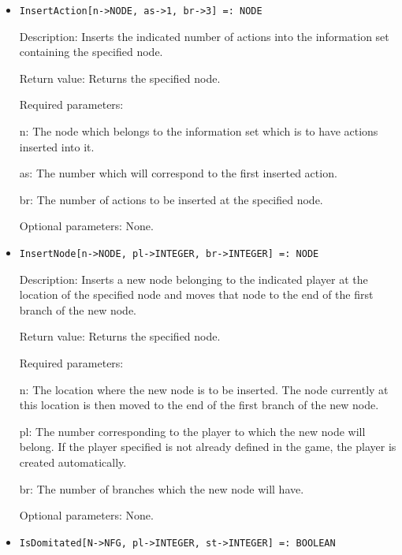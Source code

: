 \begin{itemize}
\item
\protect \large \begin{verbatim}
InsertAction[n->NODE, as->1, br->3] =: NODE
\end{verbatim}\normalsize

\bd
\item
[Description:] Inserts the indicated number of actions into the
information set containing the specified node.
\item
[Return value:] Returns the specified node.
\item
[Required parameters:]\hfil\null

\bd
\item
[n:] The node which belongs to the information set which is to have
actions inserted into it.
\item
[as:] The number which will correspond to the first inserted action.
\item
[br:] The number of actions to be inserted at the specified node.
\ed

\item
[Optional parameters:] None.
\ed

\item
\protect \large \begin{verbatim}
InsertNode[n->NODE, pl->INTEGER, br->INTEGER] =: NODE
\end{verbatim}\normalsize

\bd
\item
[Description:] Inserts a new node belonging to the indicated player at
the location of the specified node and moves that node to the end of
the first branch of the new node.
\item
[Return value:] Returns the specified node.
\item
[Required parameters:]\hfil\null

\bd
\item
[n:] The location where the new node is to be inserted.  The node
currently at this location is then moved to the end of the first
branch of the new node.
\item
[pl:] The number corresponding to the player to which the new node
will belong.  If the player specified is not already defined in	the
game, the player is created automatically.
\item
[br:] The number of branches which the new node will have.
\ed

\item
[Optional parameters:] None.
\ed

\item
\protect \large \begin{verbatim}
IsDomitated[N->NFG, pl->INTEGER, st->INTEGER] =: BOOLEAN
\end{verbatim}\normalsize


\end{itemize}
